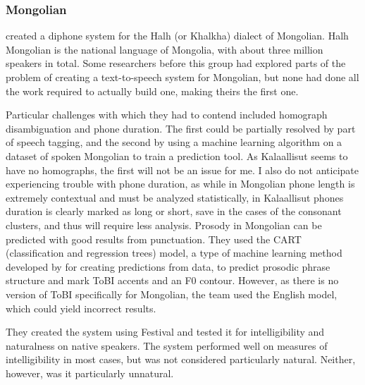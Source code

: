 \documentclass[12pt]{article}
\begin{document}
		\subsubsection{Mongolian}

		\citet{mongolian} created a diphone system for the Halh (or Khalkha) dialect of Mongolian. Halh Mongolian is the national language of Mongolia, with about three million speakers in total. Some researchers before this group had explored parts of the problem of creating a text-to-speech system for Mongolian, but none had done all the work required to actually build one, making theirs the first one. \par

		Particular challenges with which they had to contend included homograph disambiguation and phone duration. The first could be partially resolved by part of speech tagging, and the second by using a machine learning algorithm on a dataset of spoken Mongolian to train a prediction tool. As Kalaallisut seems to have no homographs, the first will not be an issue for me. I also do not anticipate experiencing trouble with phone duration, as while in Mongolian phone length is extremely contextual and must be analyzed statistically, in Kalaallisut phones duration is clearly marked as long or short, save in the cases of the consonant clusters, and thus will require less analysis. Prosody in Mongolian can be predicted with good results from punctuation. They used the CART (classification and regression trees) model, a type of machine learning method developed by \citet{cart} for creating predictions from data, to predict prosodic phrase structure and mark ToBI accents and an F0 contour. However, as there is no version of ToBI specifically for Mongolian, the team used the English model, which could yield incorrect results.\par

		They created the system using Festival and tested it for intelligibility and naturalness on native speakers. The system performed well on measures of intelligibility in most cases, but was not considered particularly natural. Neither, however, was it particularly unnatural. \par
\end{document}
